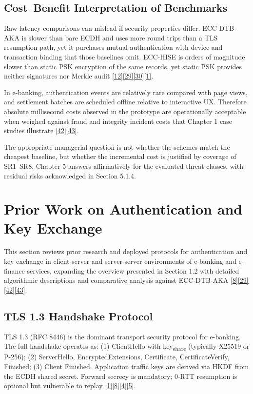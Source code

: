 \subsection{Cost--Benefit Interpretation of Benchmarks}

\indent Raw latency comparisons can mislead if security properties differ. ECC-DTB-AKA is slower than bare ECDH and uses more round trips than a TLS resumption path, yet it purchases mutual authentication with device and transaction binding that those baselines omit. ECC-HISE is orders of magnitude slower than static PSK encryption of the same records, yet static PSK provides neither signatures nor Merkle audit \hyperref[ref:12]{[12]}\hyperref[ref:29]{[29]}\hyperref[ref:30]{[30]}\hyperref[ref:1]{[1]}.

\indent In e-banking, authentication events are relatively rare compared with page views, and settlement batches are scheduled offline relative to interactive UX. Therefore absolute millisecond costs observed in the prototype are operationally acceptable when weighed against fraud and integrity incident costs that Chapter 1 case studies illustrate \hyperref[ref:42]{[42]}\hyperref[ref:43]{[43]}.

\indent The appropriate managerial question is not whether the schemes match the cheapest baseline, but whether the incremental cost is justified by coverage of SR1--SR8. Chapter 5 answers affirmatively for the evaluated threat classes, with residual risks acknowledged in Section 5.1.4.

\section{Prior Work on Authentication and Key Exchange}

\indent This section reviews prior research and deployed protocols for authentication and key exchange in client-server and server-server environments of e-banking and e-finance services, expanding the overview presented in Section 1.2 with detailed algorithmic descriptions and comparative analysis against ECC-DTB-AKA \hyperref[ref:8]{[8]}\hyperref[ref:29]{[29]}\hyperref[ref:42]{[42]}\hyperref[ref:43]{[43]}.

\subsection{TLS 1.3 Handshake Protocol}

\indent TLS 1.3 (RFC 8446) is the dominant transport security protocol for e-banking. The full handshake operates as: (1) ClientHello with key\textsubscript{share} (typically X25519 or P-256); (2) ServerHello, EncryptedExtensions, Certificate, CertificateVerify, Finished; (3) Client Finished. Application traffic keys are derived via HKDF from the ECDH shared secret. Forward secrecy is mandatory; 0-RTT resumption is optional but vulnerable to replay \hyperref[ref:1]{[1]}\hyperref[ref:8]{[8]}\hyperref[ref:4]{[4]}\hyperref[ref:5]{[5]}.

